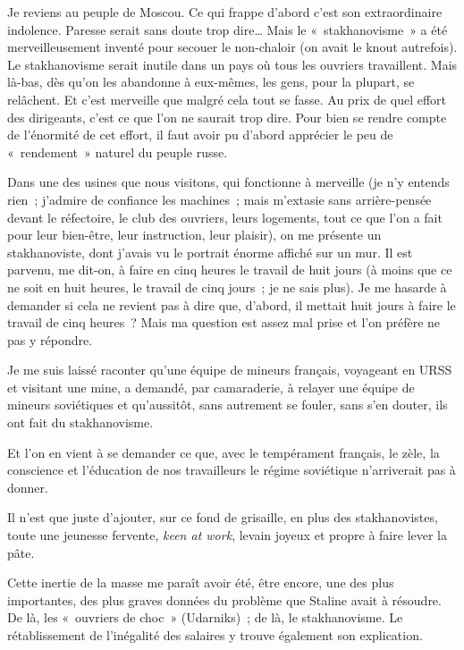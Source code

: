 \documentclass[twoside]{book} %
\begin{document}
\noindent Je reviens au peuple de Moscou. Ce qui frappe d’abord c’est son extraordinaire indolence. Paresse serait sans doute trop dire… Mais le « stakhanovisme » a été merveilleusement inventé pour secouer le non-chaloir (on avait le knout autrefois). Le stakhanovisme serait inutile dans un pays où tous les ouvriers travaillent. Mais là-bas, dès qu’on les abandonne à eux-mêmes, les gens, pour la plupart, se relâchent. Et c’est merveille que malgré cela tout se fasse. Au prix de quel effort des dirigeants, c’est ce que l’on ne saurait trop dire. Pour bien se rendre compte de l’énormité de cet effort, il faut avoir pu d’abord apprécier le peu de « rendement » naturel du peuple russe.\par
Dans une des usines que nous visitons, qui fonctionne à merveille (je n’y entends rien ; j’admire de confiance les machines ; mais m’extasie sans arrière-pensée devant le réfectoire, le club des ouvriers, leurs logements, tout ce que l’on a fait pour leur bien-être, leur instruction, leur plaisir), on me présente un stakhanoviste, dont j’avais vu le portrait énorme affiché sur un mur. Il est parvenu, me dit-on, à faire en cinq heures le travail de huit jours (à moins que ce ne soit en huit heures, le travail de cinq jours ; je ne sais plus). Je me hasarde à demander si cela ne revient pas à dire que, d’abord, il mettait huit jours à faire le travail de cinq heures ? Mais ma question est assez mal prise et l’on préfère ne pas y répondre.\par
Je me suis laissé raconter qu’une équipe de mineurs français, voyageant en URSS et visitant une mine, a demandé, par camaraderie, à relayer une équipe de mineurs soviétiques et qu’aussitôt, sans autrement se fouler, sans s’en douter, ils ont fait du stakhanovisme.\par
Et l’on en vient à se demander ce que, avec le tempérament français, le zèle, la conscience et l’éducation de nos travailleurs le régime soviétique n’arriverait pas à donner.\par
Il n’est que juste d’ajouter, sur ce fond de grisaille, en plus des stakhanovistes, toute une jeunesse fervente, \emph{keen at work}, levain joyeux et propre à faire lever la pâte.\par
Cette inertie de la masse me paraît avoir été, être encore, une des plus importantes, des plus graves données du problème que Staline avait à résoudre. De là, les « ouvriers de choc » (Udarniks) ; de là, le stakhanovisme. Le rétablissement de l’inégalité des salaires y trouve également son explication.\par
\end{document}

